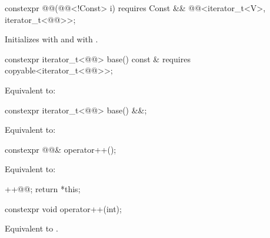 %
\begin{itemdecl}
constexpr @@(@@<!Const> i)
  requires Const && @@<iterator_t<V>, iterator_t<@@>>;
\end{itemdecl}

\begin{itemdescr}
\pnum
\effects
Initializes  with  and
 with .
\end{itemdescr}

%
\begin{itemdecl}
constexpr iterator_t<@@> base() const &
  requires copyable<iterator_t<@@>>;
\end{itemdecl}

\begin{itemdescr}
\pnum
\effects
Equivalent to: 
\end{itemdescr}

%
\begin{itemdecl}
constexpr iterator_t<@@> base() &&;
\end{itemdecl}

\begin{itemdescr}
\pnum
\effects
Equivalent to: 
\end{itemdescr}

%
\begin{itemdecl}
constexpr @@& operator++();
\end{itemdecl}

\begin{itemdescr}
\pnum
\effects
Equivalent to:
\begin{codeblock}
++@@;
return *this;
\end{codeblock}
\end{itemdescr}

%
\begin{itemdecl}
constexpr void operator++(int);
\end{itemdecl}

\begin{itemdescr}
\pnum
\effects
Equivalent to .
\end{itemdescr}

